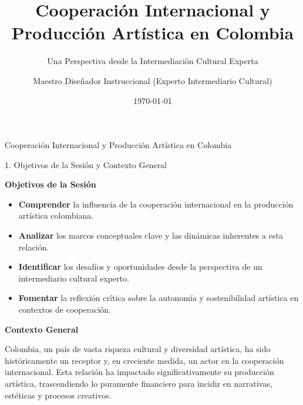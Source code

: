 \documentclass[aspectratio=169]{beamer}
\title[Cooperación Internacional y Pr]{Cooperación Internacional y Producción Artística en Colombia}
\subtitle{Una Perspectiva desde la Intermediación Cultural Experta}
\author{Maestro Diseñador Instruccional (Experto Intermediario Cultural)}
\institute{Su Institución / Nuestro Equipo}
\date{\today}
\begin{document}
\begin{frame}
  \titlepage
\end{frame}

\usebackgroundtemplate{}



\begin{frame}[fragile]{Cooperación Internacional y Producción Artística en Colombia}


\end{frame}



\begin{frame}[fragile]{1. Objetivos de la Sesión y Contexto General}


\textbf{Objetivos de la Sesión}

\begin{itemize}
  \item \textbf{Comprender} la influencia de la cooperación internacional en la producción artística colombiana.
  \item \textbf{Analizar} los marcos conceptuales clave y las dinámicas inherentes a esta relación.
  \item \textbf{Identificar} los desafíos y oportunidades desde la perspectiva de un intermediario cultural experto.
  \item \textbf{Fomentar} la reflexión crítica sobre la autonomía y sostenibilidad artística en contextos de cooperación.
\end{itemize}
\textbf{Contexto General}

Colombia, un país de vasta riqueza cultural y diversidad artística, ha sido históricamente un receptor y, en creciente medida, un actor en la cooperación internacional. Esta relación ha impactado significativamente su producción artística, trascendiendo lo puramente financiero para incidir en narrativas, estéticas y procesos creativos.

\end{frame}
\end{document}

